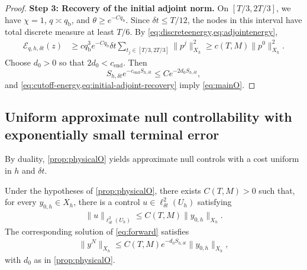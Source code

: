 \documentclass[print,wide,eng]{draft}
\begin{document}
\begin{proof}
\medskip

\textbf{Step 3: Recovery of the initial adjoint norm.}
On $[T/3,2T/3]$, we have $\chi=1$, $q\asymp q_{\mathrm b}$, and $\theta\ge e^{-Cq_{\mathrm b}}$. Since $\delta t\le T/12$, the nodes in this interval have total discrete measure at least $T/6$. By \cref{eq:discreteenergy,eq:adjointenergy},
\begin{align}\label{eq:initial-adjoint-recovery}
\mathcal E_{q,h,\delta t}(z)
&\ge cq_{\mathrm b}^3e^{-Cq_{\mathrm b}}
\delta t\sum_{t_j\in[T/3,2T/3]}\|p^j\|_{X_h}^2 \ge c(T,M)\|p^0\|_{X_h}^2.
\end{align}
Choose $d_0>0$ so that $2d_0<c_{\mathrm{end}}$. Then
$$
S_{h,\delta t}e^{-c_{\mathrm{end}}S_{h,\delta t}}
\le Ce^{-2d_0S_{h,\delta t}},
$$
and \cref{eq:cutoff-energy,eq:initial-adjoint-recovery} imply \cref{eq:mainO}.
\end{proof}



%

\subsection{Uniform approximate null controllability with exponentially small terminal error}\label{sec:approximate-control}

By duality, \cref{prop:physicalO} yields approximate null controls with a cost uniform in $h$ and ${\delta t}$.
%
\begin{theorem}\label{prop:physicalC}
Under the hypotheses of \cref{prop:physicalO}, there exists $C(T,M)>0$ such that, for every $y_{0,h}\in X_h$, there is a control $u\in\ell_{\delta t}^2(U_h)$ satisfying
%
\begin{align}\label{eq:mainC}
\|u\|_{\ell_{\delta t}^2(U_h)}\leq C(T,M)\|y_{0,h}\|_{X_h}.
\end{align}
%
The corresponding solution of \cref{eq:forward} satisfies
%
\begin{align}\label{eq:main-terminal}
\|y^N\|_{X_h}\leq C(T,M)e^{-d_0S_{h,{\delta t}}}\|y_{0,h}\|_{X_h},
\end{align}
%
with $d_0$ as in \cref{prop:physicalO}.
\end{theorem}
%
\end{document}
